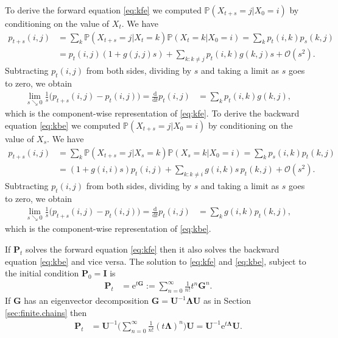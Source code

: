 \documentclass[12pt]{book}
\numberwithin{equation}{chapter}
\theoremstyle{plain}
\numberwithin{theorem}{section}
\theoremstyle{definition}
\numberwithin{exercise}{chapter}
\let\oldendproof\endproof
\renewenvironment{proof}[1][\proofname]{%
  \oldproof[\scshape\underline{#1}]%
}{\oldendproof}
\newcommand{\<}{\langle}
\renewcommand{\>}{\rangle}
\renewcommand{\(}{\left(}
\renewcommand{\)}{\right)}
\renewcommand{\[}{\left[}
\renewcommand{\]}{\right]}
\newcommand\Pb{\mathds{P}}
\newcommand\Oc{\mathscr{O}}
\newcommand\Gv{\pmb{G}}
\newcommand\Iv{\pmb{I}}
\newcommand\Pv{\pmb{P}}
\newcommand\Uv{\pmb{U}}
\newcommand\Lamv{\pmb{\Lambda}}
\newcommand\dd{\mathrm{d}}
\newcommand\ee{\mathrm{e}}
\begin{document}
\begin{proof}
To derive the forward equation \eqref{eq:kfe} we computed $\Pb(X_{t+s} = j | X_0 = i )$ by conditioning on the value of $X_t$.  We have 
\begin{align}
p_{t+s}(i,j)
	&=	\sum_k \Pb(X_{t+s}=j | X_t = k) \Pb(X_t = k | X_0 = i)
	=	\sum_k p_{t}(i,k) p_{s}(k,j) \\
	&=	p_t(i,j) (1 + g(j,j)s) + \sum_{k: k\neq j} p_{t}(i,k)  g(k,j)s + \Oc(s^2) .
\end{align}
Subtracting $p_t(i,j)$ from both sides, dividing by $s$ and taking a limit as $s$ goes to zero, we obtain
\begin{align}
\lim_{s \searrow 0 } \frac{1}{s} \Big( p_{t+s}(i,j) - p_t(i,j) \Big) = \frac{\dd}{\dd t} p_t(i,j)
	&=	\sum_{k} p_{t}(i,k)  g(k,j) ,
\end{align}
which is the component-wise representation of \eqref{eq:kfe}.
To derive the backward equation \eqref{eq:kbe} we computed $\Pb(X_{t+s} = j | X_0 = i )$ by conditioning on the value of $X_s$.  We have 
\begin{align}
p_{t+s}(i,j)
	&=	\sum_k \Pb(X_{t+s}=j | X_s = k) \Pb(X_s = k | X_0 = i)
	=	\sum_k p_{s}(i,k) p_{t}(k,j) \\
	&=	(1 + g(i,i)s)p_t(i,j)  + \sum_{k: k\neq i} g(i,k)s \, p_{t}(k,j)   + \Oc(s^2) .
\end{align}
Subtracting $p_t(i,j)$ from both sides, dividing by $s$ and taking a limit as $s$ goes to zero, we obtain
\begin{align}
\lim_{s \searrow 0 } \frac{1}{s} \Big( p_{t+s}(i,j) - p_t(i,j) \Big) = \frac{\dd}{\dd t} p_t(i,j)
	&=	\sum_{k} g(i,k) p_{t}(k,j) ,
\end{align}
which is the component-wise representation of \eqref{eq:kbe}.
\end{proof}

\noindent
If $\Pv_t$ solves the forward equation \eqref{eq:kfe} then it also solves the backward equation \eqref{eq:kbe} and vice versa.  The solution to \eqref{eq:kfe} and \eqref{eq:kbe}, subject to the initial condition $\Pv_0 = \Iv$ is
\begin{align}
\Pv_t
	&=	\ee^{t \Gv} :=	\sum_{n=0}^\infty \frac{1}{n!} t^n \Gv^n .
\end{align}
If $\Gv$ has an eigenvector decomposition $\Gv = \Uv^{-1} \Lamv \Uv$ as in Section \ref{sec:finite.chains} then
\begin{align}
\Pv_t
	&=	\Uv^{-1} \Big( \sum_{n=0}^\infty \frac{1}{n!} (t \Lamv)^n \Big) \Uv 
	=		\Uv^{-1} \ee^{t \Lamv} \Uv . \label{eq:Pt.spectral}
\end{align}
\end{document}
